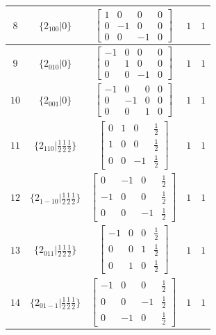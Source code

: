 \documentclass[fleqn,8pt]{jsarticle}
\begin{document}
\begin{longtable}{ccccc}
$ 8 $ & $ \{2{}_{100}|0\} $ & $ \begin{bmatrix} 1 & 0 & 0 & 0 \\ 0 & -1 & 0 & 0 \\ 0 & 0 & -1 & 0 \end{bmatrix} $ & $ 1 $ & $ 1 $ \\ \hline
$ 9 $ & $ \{2{}_{010}|0\} $ & $ \begin{bmatrix} -1 & 0 & 0 & 0 \\ 0 & 1 & 0 & 0 \\ 0 & 0 & -1 & 0 \end{bmatrix} $ & $ 1 $ & $ 1 $ \\ \hline
$ 10 $ & $ \{2{}_{001}|0\} $ & $ \begin{bmatrix} -1 & 0 & 0 & 0 \\ 0 & -1 & 0 & 0 \\ 0 & 0 & 1 & 0 \end{bmatrix} $ & $ 1 $ & $ 1 $ \\ \hline
$ 11 $ & $ \{2{}_{110}|\frac{1}{2} \frac{1}{2} \frac{1}{2}\} $ & $ \begin{bmatrix} 0 & 1 & 0 & \frac{1}{2} \\ 1 & 0 & 0 & \frac{1}{2} \\ 0 & 0 & -1 & \frac{1}{2} \end{bmatrix} $ & $ 1 $ & $ 1 $ \\ \hline
$ 12 $ & $ \{2{}_{1-10}|\frac{1}{2} \frac{1}{2} \frac{1}{2}\} $ & $ \begin{bmatrix} 0 & -1 & 0 & \frac{1}{2} \\ -1 & 0 & 0 & \frac{1}{2} \\ 0 & 0 & -1 & \frac{1}{2} \end{bmatrix} $ & $ 1 $ & $ 1 $ \\ \hline
$ 13 $ & $ \{2{}_{011}|\frac{1}{2} \frac{1}{2} \frac{1}{2}\} $ & $ \begin{bmatrix} -1 & 0 & 0 & \frac{1}{2} \\ 0 & 0 & 1 & \frac{1}{2} \\ 0 & 1 & 0 & \frac{1}{2} \end{bmatrix} $ & $ 1 $ & $ 1 $ \\ \hline
$ 14 $ & $ \{2{}_{01-1}|\frac{1}{2} \frac{1}{2} \frac{1}{2}\} $ & $ \begin{bmatrix} -1 & 0 & 0 & \frac{1}{2} \\ 0 & 0 & -1 & \frac{1}{2} \\ 0 & -1 & 0 & \frac{1}{2} \end{bmatrix} $ & $ 1 $ & $ 1 $ \\ \hline

\end{longtable}
\end{document}
